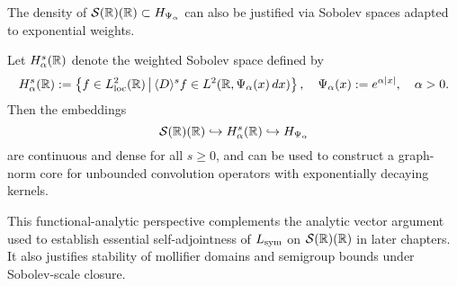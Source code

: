 \begin{remark}
\label{rem:sobolev_core_reference}
The density of \( \mathcal{S}(\mathbb{R})(\mathbb{R}) \subset H_{\Psi_\alpha} \) can also be justified via Sobolev spaces adapted to exponential weights.

\medskip

Let \( H^s_\alpha(\mathbb{R}) \) denote the weighted Sobolev space defined by
\[
H^s_\alpha(\mathbb{R}) := \left\{ f \in L^2_{\mathrm{loc}}(\mathbb{R}) \,\middle|\, \langle D \rangle^s f \in L^2(\mathbb{R}, \Psi_\alpha(x)\, dx) \right\}, \quad \Psi_\alpha(x) := e^{\alpha |x|}, \quad \alpha > 0.
\]
Then the embeddings
\[
\mathcal{S}(\mathbb{R})(\mathbb{R}) \hookrightarrow H^s_\alpha(\mathbb{R}) \hookrightarrow H_{\Psi_\alpha}
\]
are continuous and dense for all \( s \ge 0 \), and can be used to construct a graph-norm core for unbounded convolution operators with exponentially decaying kernels.

\medskip

This functional-analytic perspective complements the analytic vector argument used to establish essential self-adjointness of \( L_{\mathrm{sym}} \) on \( \mathcal{S}(\mathbb{R})(\mathbb{R}) \) in later chapters. It also justifies stability of mollifier domains and semigroup bounds under Sobolev-scale closure.
\end{remark}
